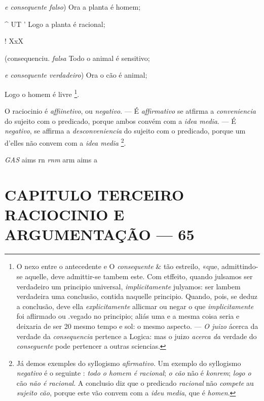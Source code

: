 \emph{e consequente falso}) Ora a planta é homem;

\textasciicircum{} UT ' Logo a planta é racional;

! XxX

(consequenciu. \emph{falsa} Todo o animal é sensitivo;

\emph{e consequente verdadeiro}) Ora o cão é animal;

Logo o homem é livre \footnote{O nexo entre o antecedente e O \emph{consequente} \& tão estreilo, «que, admittindo-se aquelle, deve admittir-se tambem este. Com etffeito, quando julsamos ser verdadeiro um principio universal, \emph{implicitamente} julyamos: ser lambem verdadeira uma conclusão, contida naquelle principio. Quando, pois, se deduz a conclusão, deve ella \emph{explicitamente} allicmar ou negar o que \emph{implicitamente} foi aflirmado ou .vegado no principio; aliás uma e a mesma coisa seria e deixaria de ser 20 mesmo tempo e sol: o mesmo aspecto. --- \emph{O juizo} ácerca da verdade da \emph{consequencia} pertence a Logica: mas o juizo \emph{acerca da} verdade do \emph{conseguente} pode pertencer a outras sciencias.}.


 
O raciocinio é \emph{affiinetivo}, ou \emph{negativo}. --- É \emph{affirmativo} se atfirma a \emph{conveniencia} do sujeito com o predicado, porque ambos convém com a \emph{idea media}. --- É \emph{negativo}, se affirma a \emph{desconveniencia} do sujeito com o predicado, porque um d'elles não convem com a \emph{idea media} \footnote{Já demos exemples do syllogismo \emph{afirmativo}. Um exemplo do syllogismo \emph{negativo} é o seguinte : \emph{todo o homem é racional}; \emph{o cão} não é \emph{konrem}; \emph{logo o} cão \emph{não é racional}. A conclusio diz que o predicado \emph{racional} não \emph{compete} au \emph{sujeito cão}, porque este vão convem com a \emph{ideu media}, que é \emph{homen}.}.

\emph{GAS} aims rn \emph{rnm} arm aims a


\chapter*{CAPITULO TERCEIRO\\[0.3em]\large RACIOCINIO E ARGUMENTAÇÃO --- 65}


